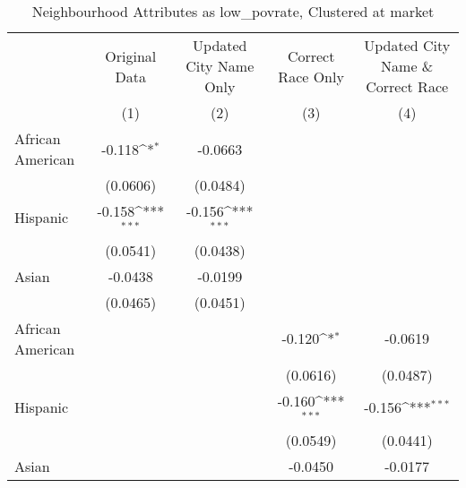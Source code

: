 \documentclass{article}
\begin{document}
\begin{landscape}

\begin{table}[htbp]\centering
\def\sym#1{\ifmmode^{#1}\else\(^{#1}\)\fi}
\caption{Neighbourhood Attributes as low\_povrate, Clustered at market}
\begin{tabular}{l*{4}{c}}
\toprule
                         &\multicolumn{1}{c}{Original Data}&\multicolumn{1}{c}{Updated City Name Only}&\multicolumn{1}{c}{Correct Race Only}&\multicolumn{1}{c}{Updated City Name \& Correct Race}\\\cmidrule(lr){2-2}\cmidrule(lr){3-3}\cmidrule(lr){4-4}\cmidrule(lr){5-5}
                         &\multicolumn{1}{c}{(1)}         &\multicolumn{1}{c}{(2)}         &\multicolumn{1}{c}{(3)}         &\multicolumn{1}{c}{(4)}         \\
\midrule
African American         &      -0.118\sym{*}  &     -0.0663         &                     &                     \\
                         &    (0.0606)         &    (0.0484)         &                     &                     \\
\addlinespace
Hispanic                 &      -0.158\sym{***}&      -0.156\sym{***}&                     &                     \\
                         &    (0.0541)         &    (0.0438)         &                     &                     \\
\addlinespace
Asian                    &     -0.0438         &     -0.0199         &                     &                     \\
                         &    (0.0465)         &    (0.0451)         &                     &                     \\
\addlinespace
African American         &                     &                     &      -0.120\sym{*}  &     -0.0619         \\
                         &                     &                     &    (0.0616)         &    (0.0487)         \\
\addlinespace
Hispanic                 &                     &                     &      -0.160\sym{***}&      -0.156\sym{***}\\
                         &                     &                     &    (0.0549)         &    (0.0441)         \\
\addlinespace
Asian                    &                     &                     &     -0.0450         &     -0.0177         \\

\end{tabular}
\end{table}
\end{landscape}
\end{document}
